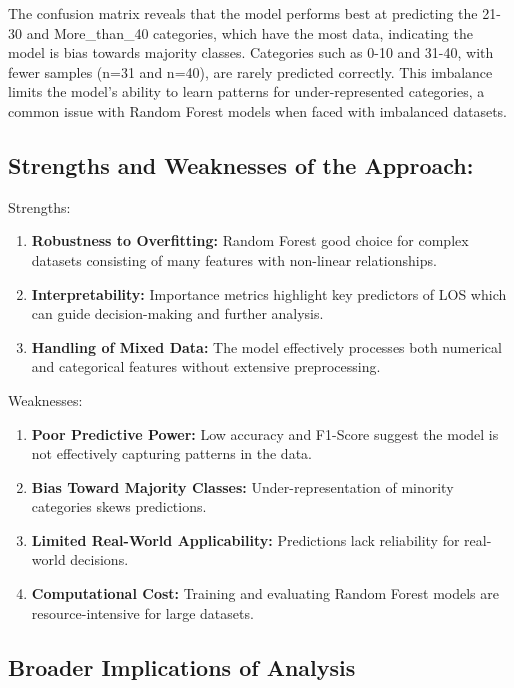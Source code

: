 \documentclass[
]{article}
\providecommand{\tightlist}{%
  \setlength{\itemsep}{0pt}\setlength{\parskip}{0pt}}
\begin{document}
The confusion matrix reveals that the model performs best at predicting
the 21-30 and More\_than\_40 categories, which have the most data,
indicating the model is bias towards majority classes. Categories such
as 0-10 and 31-40, with fewer samples (n=31 and n=40), are rarely
predicted correctly. This imbalance limits the model's ability to learn
patterns for under-represented categories, a common issue with Random
Forest models when faced with imbalanced datasets.

\subsection{Strengths and Weaknesses of the
Approach:}\label{strengths-and-weaknesses-of-the-approach}

Strengths:

\begin{enumerate}
\def\labelenumi{\arabic{enumi}.}
\tightlist
\item
  \textbf{Robustness to Overfitting:} Random Forest good choice for
  complex datasets consisting of many features with non-linear
  relationships.
\item
  \textbf{Interpretability:} Importance metrics highlight key predictors
  of LOS which can guide decision-making and further analysis.
\item
  \textbf{Handling of Mixed Data:} The model effectively processes both
  numerical and categorical features without extensive preprocessing.
\end{enumerate}

Weaknesses:

\begin{enumerate}
\def\labelenumi{\arabic{enumi}.}
\tightlist
\item
  \textbf{Poor Predictive Power:} Low accuracy and F1-Score suggest the
  model is not effectively capturing patterns in the data.
\item
  \textbf{Bias Toward Majority Classes:} Under-representation of
  minority categories skews predictions.
\item
  \textbf{Limited Real-World Applicability:} Predictions lack
  reliability for real-world decisions.
\item
  \textbf{Computational Cost:} Training and evaluating Random Forest
  models are resource-intensive for large datasets.
\end{enumerate}

\subsection{Broader Implications of
Analysis}\label{broader-implications-of-analysis}
\end{document}
